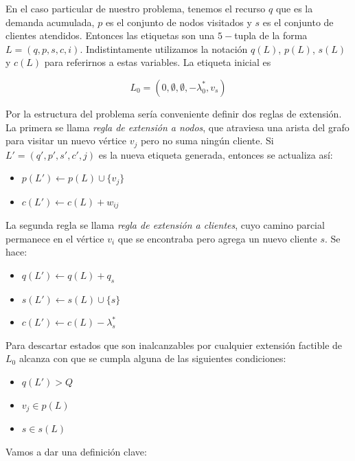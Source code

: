 En el caso particular de nuestro problema, tenemos el recurso $q$ que es la demanda acumulada, $p$ es el conjunto de nodos visitados y $s$ es el conjunto de clientes atendidos. Entonces las etiquetas son una $5-$tupla de la forma $L = (q, p, s, c, i)$. Indistintamente utilizamos la notación $q(L)$, $p(L)$, $s(L)$ y $c(L)$ para referirnos a estas variables. La etiqueta inicial es 

\begin{equation}
    L_0 = (0, \emptyset, \emptyset, -\lambda^{*}_0, v_s)
\end{equation}

Por la estructura del problema sería conveniente definir dos reglas de extensión. La primera se llama \emph{regla de extensión a nodos}, que atraviesa una arista del grafo para visitar un nuevo vértice $v_j$ pero no suma ningún cliente. Si $L' = (q', p', s', c', j)$ es la nueva etiqueta generada, entonces se actualiza así:

\begin{itemize}
    \item $p(L') \gets p(L) \cup \{v_j\}$
    \item $c(L') \gets c(L) + w_{ij}$
\end{itemize}

La segunda regla se llama \emph{regla de extensión a clientes}, cuyo camino parcial permanece en el vértice $v_i$ que se encontraba pero agrega un nuevo cliente $s$. Se hace:

\begin{itemize}
    \item $q(L') \gets q(L) + q_ s$
    \item $s(L') \gets s(L) \cup \{s\}$
    \item $c(L') \gets c(L) - \lambda^{*}_s$
\end{itemize}

Para descartar estados que son inalcanzables por cualquier extensión factible de $L_0$ alcanza con que se cumpla alguna de las siguientes condiciones:

\begin{itemize}
    \item $q(L') > Q$
    \item $v_j \in p(L)$
    \item $s \in s(L)$
\end{itemize}

Vamos a dar una definición clave:

